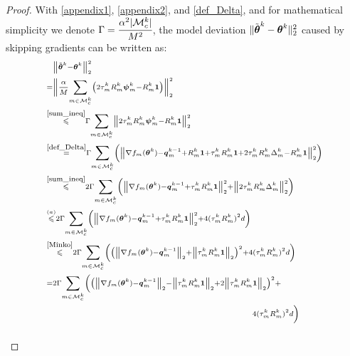 \documentclass[lettersize,journal]{IEEEtran}
\begin{document}
\begin{proof}
With \eqref{appendix1}, \eqref{appendix2}, and \eqref{def_Delta}, and for mathematical simplicity we denote $\Gamma = \cfrac{\alpha^2|\mathcal{M}_c^k|}{M^2}$, the model deviation $\|\Tilde{\boldsymbol{\theta}}^k-\boldsymbol{\theta}^k\|_2^2$ caused by skipping gradients can be written as:
\begin{equation}
\scriptsize
\thinmuskip=0mu
\medmuskip=0mu
\thickmuskip=0mu
\begin{aligned}
&\phantom{=} \left\|\Tilde{\boldsymbol{\theta}}^k-\boldsymbol{\theta}^k\right\|_2^2\\
&=\bigg\|\frac{\alpha}{M}\sum_{m \in \mathcal{M}_c^{k}}\left(2 \tau_m^k R_m^k \boldsymbol{\psi}_{m}^{k}-R_m^k \boldsymbol{1}\right)\bigg\|_2^2\\
&\overset{\eqref{sum_ineq}}{\leqslant} \Gamma \sum_{m \in \mathcal{M}_c^{k}}\left\|2 \tau_m^k R_m^k \boldsymbol{\psi}_{m}^{k}-R_m^k \boldsymbol{1}\right\|_2^2\\
& \overset{\eqref{def_Delta}}{=} \Gamma \sum_{m \in \mathcal{M}_c^{k}} \left(\left\|\nabla f_m(\boldsymbol{\theta}^k)-\boldsymbol{q}_{m}^{k-1}+R_m^k \boldsymbol{1}+\tau_m^k R_m^k \boldsymbol{1}+2 \tau_m^k R_m^k\Delta_m^k - R_m^k \boldsymbol{1}\right\|_2^2\right)\\
& \overset{\eqref{sum_ineq}}{\leqslant} 2\Gamma \sum_{m \in \mathcal{M}_c^{k}} \left(\left\|\nabla f_m(\boldsymbol{\theta}^k)-\boldsymbol{q}_{m}^{k-1}+\tau_m^k R_m^k \boldsymbol{1}\right\|_2^2 + \left\|2 \tau_m^k R_m^k \Delta_m^k\right\|_2^2\right)\\
& \overset{(a)}{\leqslant} 2\Gamma \sum_{m \in \mathcal{M}_c^{k}} \left(\left\|\nabla f_m(\boldsymbol{\theta}^k)-\boldsymbol{q}_{m}^{k-1}+\tau_m^k R_m^k \boldsymbol{1}\right\|_2^2 + 4 (\tau_m^k R_m^k)^2 d\right)\\
& \overset{\eqref{Minko}}{\leqslant} 2\Gamma \sum_{m \in \mathcal{M}_c^{k}} \left(\left(\left\|\nabla f_m(\boldsymbol{\theta}^k)-\boldsymbol{q}_{m}^{k-1}\right\|_2+\left\|\tau_m^k R_m^k \boldsymbol{1}\right\|_2\right)^2 + 4 (\tau_m^k R_m^k)^2 d\right)\\
& = 2\Gamma \sum_{m \in \mathcal{M}_c^{k}} \bigg(\left(\left\|\nabla f_m(\boldsymbol{\theta}^k)-\boldsymbol{q}_{m}^{k-1}\right\|_2-\left\|\tau_m^k R_m^k \boldsymbol{1}\right\|_2+2\left\|\tau_m^k R_m^k \boldsymbol{1}\right\|_2\right)^2 + \\ 
&\phantom{ = 2\Gamma \sum_{m \in \mathcal{M}_c^{k}} \bigg((\left\|\nabla f_m(\boldsymbol{\theta}^k)-\boldsymbol{q}_{m}^{k-1}\right\|_2-\left\|\tau_m^k R_m^k \boldsymbol{1}\right\|_2}  \qquad \qquad \quad 4 (\tau_m^k R_m^k)^2 d\bigg)\\

\end{aligned}
\end{equation}
\end{proof}
\end{document}
